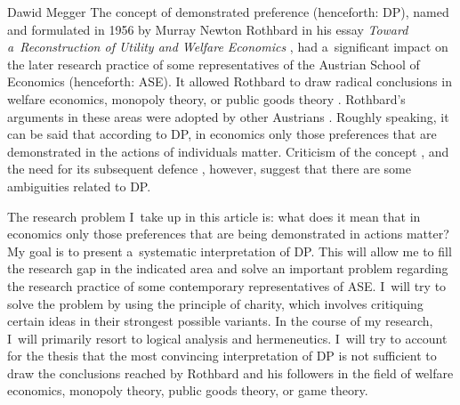 \begin{artengenv}{Dawid Megger}
\lettrine[loversize=0.13,lines=2,lraise=-0.03,nindent=0em,findent=0.2pt]%
{T}{}he concept of demonstrated preference (henceforth: DP), named and formulated in 1956 by Murray Newton Rothbard in his essay \textit{Toward a~Reconstruction of Utility and Welfare Economics} 
\parencite[][]{rothbard_present_2011}, %
 had a~significant impact on the later research practice of some representatives of the Austrian School of Economics (henceforth: ASE). It allowed Rothbard to draw radical conclusions in welfare economics, monopoly theory, or public goods theory 
\parencites[cf.][]{rothbard_man_2009}[][]{rothbard_power_2009}[][]{rothbard_present_2011}. %
 Rothbard's arguments in these areas were adopted by other Austrians 
\parencites[e.g.,][]{block_public_1983}[][]{herbener_defense_2008}[][]{hoppe_theory_1989}[][]{hoppe_economics_2006}[][]{wisniewski_economics_2018}. %
 Roughly speaking, it can be said that according to DP, in economics only those preferences that are demonstrated in the actions of individuals matter. Criticism of the concept 
\parencites[e.g.][]{nozick_austrian_1977}[][]{caplan_austrian_1999}[][]{kvasnicka_rothbards_2008}, %
 and the need for its subsequent defence 
\parencites[e.g.,][]{block_austrian_1999}[][]{wysocki_rothbards_2019}[][]{gordon_misunderstanding_2022}, %
 however, suggest that there are some ambiguities related to DP.



The research problem I~take up in this article is: what does it mean that in economics only those preferences that are being demonstrated in actions matter? My goal is to present a~systematic interpretation of DP. This will allow me to fill the research gap in the indicated area and solve an important problem regarding the research practice of some contemporary representatives of ASE. I~will try to solve the problem by using the principle of charity, which involves critiquing certain ideas in their strongest possible variants. In the course of my research, I~will primarily resort to logical analysis and hermeneutics. I~will try to account for the thesis that the most convincing interpretation of DP is not sufficient to draw the conclusions reached by Rothbard and his followers in the field of welfare economics, monopoly theory, public goods theory, or game theory.




\end{artengenv}
